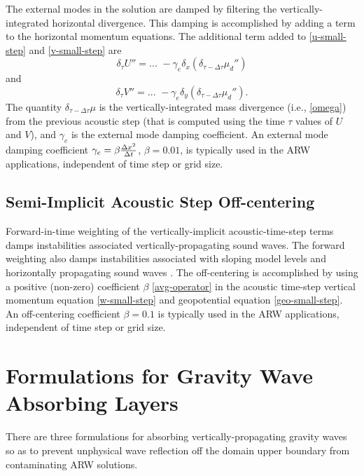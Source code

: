 The external modes in the solution are damped by filtering
the vertically-integrated horizontal divergence.
This damping is accomplished by
adding a term to the horizontal momentum equations.  The additional
term added to \eqref{u-small-step} and \eqref{v-small-step} are
%
\begin{equation}
\delta_\tau U'' = ... \,\,
- \gamma_e \delta_x (\delta_{\tau-\Delta \tau} \mu_d'')
\end{equation}
\noindent 
and
\begin{equation}
\delta_\tau V'' = ... \,\, 
- \gamma_e \delta_y (\delta_{\tau-\Delta \tau} \mu_d'').
\end{equation}
%
\noindent
The quantity $\delta_{\tau - \Delta \tau} \mu $ is the vertically-integrated 
mass divergence (i.e., \eqref{omega}) from the previous
acoustic step (that is computed using
the time $\tau$ values of $U$ and $V$), and
$\gamma_e$ is the external mode damping coefficient.  An external mode
damping coefficient $\gamma_e = \beta{\Delta x^2\over \Delta t}$,  
$\beta = 0.01$, is typically used in the ARW
applications, independent of time step or grid size.

\subsection{Semi-Implicit Acoustic Step Off-centering}
\label{offcentering}

Forward-in-time weighting of the vertically-implicit
acoustic-time-step terms damps instabilities associated
vertically-propagating sound waves.  The forward weighting also damps
instabilities associated with sloping model levels and horizontally
propagating sound waves
\citep[see][]{durran_klemp83, dudhia95}.  The off-centering
is accomplished by using a positive (non-zero) coefficient $\beta$
\eqref{avg-operator} in the acoustic time-step vertical momentum
equation \eqref{w-small-step} and geopotential equation
\eqref{geo-small-step}.  An off-centering coefficient $\beta = 0.1$ is
typically used in the ARW applications, independent of time step or
grid size.

\section{Formulations for Gravity Wave Absorbing Layers}

There are three formulations for absorbing vertically-propagating
gravity waves so as to prevent unphysical wave reflection off the
domain upper boundary from contaminating ARW solutions.

